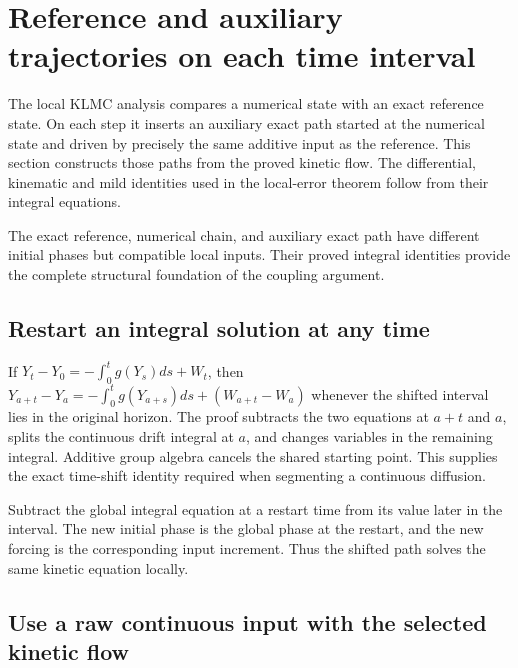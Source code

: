 \documentclass[11pt,a4paper]{report}
\begin{document}
\section{\texorpdfstring{Reference and auxiliary trajectories on each time interval}{Reference and auxiliary trajectories on each time interval}}
\label{proof-module-KineticLangevin-CoupledSegments-lean}


The local KLMC analysis compares a numerical state with an exact reference state. On each step it inserts an auxiliary exact path started at the numerical state and driven by precisely the same additive input as the reference. This section constructs those paths from the proved kinetic flow. The differential, kinematic and mild identities used in the local-error theorem follow from their integral equations.



The exact reference, numerical chain, and auxiliary exact path have different initial phases but compatible local inputs. Their proved integral identities provide the complete structural foundation of the coupling argument.

\subsection{\texorpdfstring{Restart an integral solution at any time}{Restart an integral solution at any time}}
\label{report-step-KineticLangevin-CoupledSegments-lean-1}


If \(Y_t-Y_0=-\int_0^tg(Y_s)ds+W_t\), then \(Y_{a+t}-Y_a=-\int_0^tg(Y_{a+s})ds+(W_{a+t}-W_a)\) whenever the shifted interval lies in the original horizon. The proof subtracts the two equations at \(a+t\) and \(a\), splits the continuous drift integral at \(a\), and changes variables in the remaining integral. Additive group algebra cancels the shared starting point. This supplies the exact time-shift identity required when segmenting a continuous diffusion.



Subtract the global integral equation at a restart time from its value later in the interval. The new initial phase is the global phase at the restart, and the new forcing is the corresponding input increment. Thus the shifted path solves the same kinetic equation locally.

\subsection{\texorpdfstring{Use a raw continuous input with the selected kinetic flow}{Use a raw continuous input with the selected kinetic flow}}
\label{report-step-KineticLangevin-CoupledSegments-lean-2}
\end{document}
